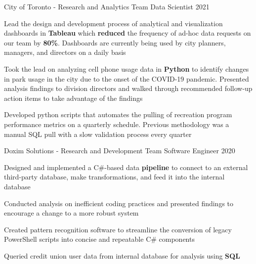 

\begin{cventries}

    \cventry
    {City of Toronto - Research and Analytics Team} %
    {Data Scientist} %
    {2021} %
    {} %
    {
        \begin{cvitems} %
            \item {Lead the design and development process of analytical and visualization dashboards in \textbf{Tableau} which \textbf{reduced} the frequency of ad-hoc data requests on our team by \textbf{80\%}. Dashboards are currently being used by city planners, managers, and directors on a daily basis}
            \item {Took the lead on analyzing cell phone usage data in \textbf{Python} to identify changes in park usage in the city due to the onset of the COVID-19 pandemic. Presented analysis findings to division directors and walked through recommended follow-up action items to take advantage of the findings}
            \item {Developed python scripts that automates the pulling of recreation program performance metrics on a quarterly schedule. Previous methodology was a manual SQL pull with a slow validation process every quarter}
        \end{cvitems}
    }
    
    \cventry
    {Doxim Solutions - Research and Development Team} %
    {Software Engineer} %
    {2020} %
    {} %
    {
        \begin{cvitems} %
            \item {Designed and implemented a C\#-based data \textbf{pipeline} to connect to an external third-party database, make transformations, and feed it into the internal database}
            \item {Conducted analysis on inefficient coding practices and presented findings to encourage a change to a more robust system}
            \item {Created pattern recognition software to streamline the conversion of legacy PowerShell scripts into concise and repeatable C\# components}
            \item{Queried credit union user data from internal database for analysis using \textbf{SQL}}
        \end{cvitems}
    }
    

\end{cventries}
